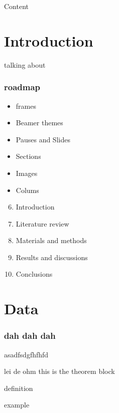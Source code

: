 \documentclass[aspectratio=169]{beamer}
\begin{document}
\begin{frame}{Content}
\tableofcontents
\end{frame}




\section{Introduction}




\begin{frame}{talking about}

\frametitle{roadmap}

\begin{itemize}
\item frames
\pause
\item Beamer themes
\item Pauses and Slides
\item Sections
\item Images
\item Colums
\end{itemize}

\begin{enumerate}
\setcounter{enumi}{5}
\itemsep0.75em
\item <1> Introduction
\item Literature review
\item Materials and methods
\item Results and discussions
\item Conclusions
\end{enumerate}

\end{frame}

\section{Data}

\begin{frame}
\frametitle{dah dah dah}

asadfsdgfhfhfd

\begin{theorem}{lei de ohm}
this is the theorem block
\end{theorem}
\begin{definition}
definition
\end{definition}
\begin{example}
example
\end{example}

\end{frame}
\end{document}
